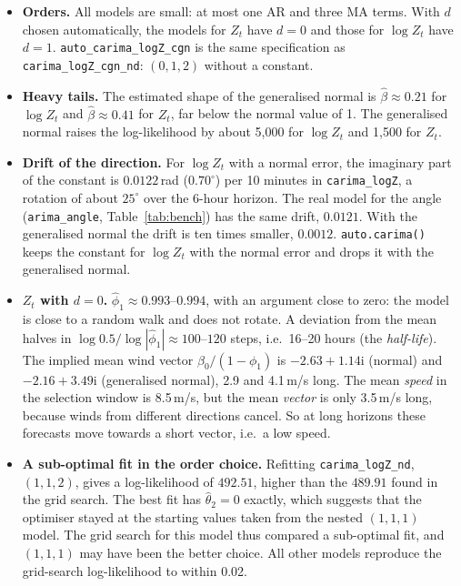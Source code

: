 \documentclass[11pt,a4paper]{article}
\newcommand{\iu}{\mathrm{i}}
\newcommand{\code}[1]{\texttt{#1}}
\begin{document}
\begin{itemize}
  \item \textbf{Orders.} All models are small: at most one AR and three MA terms. With $d$ chosen
    automatically, the models for $Z_t$ have $d = 0$ and those for $\log Z_t$ have $d = 1$.
    \code{auto\_carima\_logZ\_cgn} is the same specification as \code{carima\_logZ\_cgn\_nd}:
    $(0,1,2)$ without a constant.
  \item \textbf{Heavy tails.} The estimated shape of the generalised normal is
    $\hat\beta \approx 0.21$ for $\log Z_t$ and $\hat\beta \approx 0.41$ for $Z_t$, far below the
    normal value of 1. The generalised normal raises the log-likelihood by about 5,000 for
    $\log Z_t$ and 1,500 for $Z_t$.
  \item \textbf{Drift of the direction.} For $\log Z_t$ with a normal error, the imaginary part of
    the constant is $0.0122$\,rad ($0.70^\circ$) per 10 minutes in \code{carima\_logZ}, a rotation
    of about $25^\circ$ over the 6-hour horizon. The real model for the angle (\code{arima\_angle},
    Table~\ref{tab:bench}) has the same drift, $0.0121$. With the generalised normal the drift is
    ten times smaller, $0.0012$. \code{auto.carima()} keeps the constant for $\log Z_t$ with the
    normal error and drops it with the generalised normal.
  \item \textbf{$Z_t$ with $d = 0$.} $\hat\phi_1 \approx 0.993$--$0.994$, with an argument close
    to zero: the model is close to a random walk and does not rotate. A deviation from the mean
    halves in $\log 0.5 / \log|\hat\phi_1| \approx 100$--$120$ steps, i.e.\ 16--20 hours (the
    \emph{half-life}). The implied mean wind vector $\beta_0/(1 - \phi_1)$ is $-2.63 + 1.14\iu$
    (normal) and $-2.16 + 3.49\iu$ (generalised normal), 2.9 and 4.1\,m/s long. The mean
    \emph{speed} in the selection window is 8.5\,m/s, but the mean \emph{vector} is only 3.5\,m/s
    long, because winds from different directions cancel. So at long horizons these forecasts
    move towards a short vector, i.e.\ a low speed.
  \item \textbf{A sub-optimal fit in the order choice.} Refitting \code{carima\_logZ\_nd},
    $(1,1,2)$, gives a log-likelihood of $492.51$, higher than the $489.91$ found in the grid
    search. The best fit has $\hat\theta_2 = 0$ exactly, which suggests that the optimiser stayed
    at the starting values taken from the nested $(1,1,1)$ model. The grid search for this model
    thus compared a sub-optimal fit, and $(1,1,1)$ may have been the better choice. All other
    models reproduce the grid-search log-likelihood to within 0.02.
\end{itemize}
\end{document}
